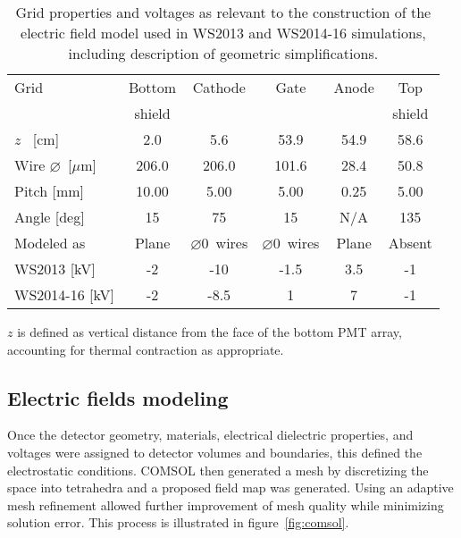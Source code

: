 \documentclass[11pt,a4paper]{article}
\begin{document}
\begin{table}[ht]
\setlength{\extrarowheight}{2pt}
\caption{Grid properties and voltages as relevant to the construction of the electric field model used in WS2013 and WS2014-16 simulations, including description of geometric simplifications.
\label{Table:grid_properties}}
\begin{center}
\begin{threeparttable}
\begin{tabular}{|l *{5}{S[table-format=-3.2]}|}
\hline
{Grid} & {Bottom} & {Cathode} & {Gate} & {Anode} & {Top} \\
{} & {shield} & {} & {} & {} & {shield} \\
\hline
$z$\tnote{\dag} ~[cm] & 2.0 & 5.6 & 53.9 & 54.9 & 58.6 \\
Wire $\varnothing$~[$\mu$m] & 206.0 & 206.0 & 101.6 & 28.4 & 50.8 \\
Pitch [mm] & 10.00 & 5.00 & 5.00 & 0.25 & 5.00 \\
Angle [deg] & 15 & 75 & 15 & N/A & 135 \\
Modeled as &  {Plane}  & {$\varnothing$0~wires}  & {$\varnothing$0~wires} & {Plane} & {Absent} \\
WS2013 [kV] & -2 & -10 & -1.5 & 3.5 & -1 \\
WS2014-16 [kV] & -2 & -8.5 & 1 & 7 & -1 \\
\hline
\end{tabular}
\begin{tablenotes}
\item[\dag] $z$ is defined as vertical distance from the face of the bottom PMT array, accounting for thermal contraction as appropriate.
\end{tablenotes}
\end{threeparttable}
\end{center}
\end{table}


\subsection{Electric fields modeling}\label{EFields_Modeling}

Once the detector geometry, materials, electrical dielectric properties, and voltages were assigned to detector volumes and boundaries, this defined the electrostatic conditions. \textsc{COMSOL} then generated a mesh by discretizing the space into tetrahedra and a proposed field map was generated. Using an adaptive mesh refinement allowed further improvement of mesh quality while minimizing solution error. This process is illustrated in figure~\ref{fig:comsol}. 
\end{document}
